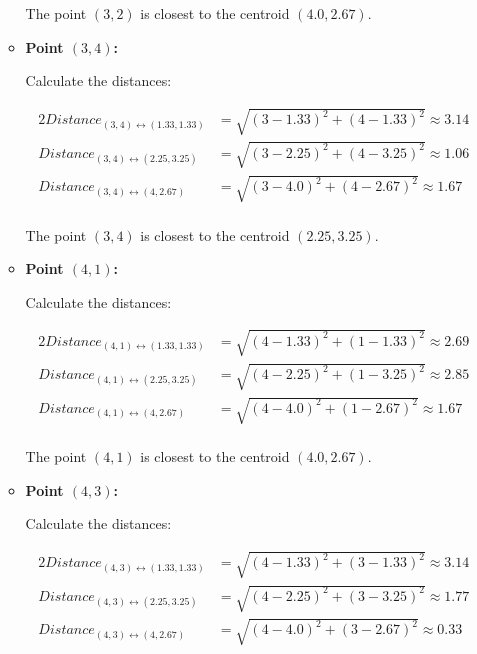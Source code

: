 \documentclass[
english,
smallborders
]{i6prcsht}
\begin{document}
\begin{solution}
\begin{enumerate}
\begin{itemize}
			            The point $(3,2)$ is closest to the centroid $(4.0,2.67)$.

			      \item \textbf{Point $(3,4)$:}

			            Calculate the distances:

			            \begin{alignat*}{2}
				            Distance_{(3,4)\leftrightarrow(1.33,1.33)} & = \sqrt{(3-1.33)^2+(4-1.33)^2} \approx 3.14 \\
				            Distance_{(3,4)\leftrightarrow(2.25,3.25)} & = \sqrt{(3-2.25)^2+(4-3.25)^2} \approx 1.06 \\
				            Distance_{(3,4)\leftrightarrow(4,2.67)}    & = \sqrt{(3-4.0)^2+(4-2.67)^2} \approx 1.67  \\
			            \end{alignat*}

			            The point $(3,4)$ is closest to the centroid $(2.25,3.25)$.

			      \item \textbf{Point $(4,1)$:}

			            Calculate the distances:

			            \begin{alignat*}{2}
				            Distance_{(4,1)\leftrightarrow(1.33,1.33)} & = \sqrt{(4-1.33)^2+(1-1.33)^2} \approx 2.69 \\
				            Distance_{(4,1)\leftrightarrow(2.25,3.25)} & = \sqrt{(4-2.25)^2+(1-3.25)^2} \approx 2.85 \\
				            Distance_{(4,1)\leftrightarrow(4,2.67)}    & = \sqrt{(4-4.0)^2+(1-2.67)^2} \approx 1.67  \\
			            \end{alignat*}

			            The point $(4,1)$ is closest to the centroid $(4.0,2.67)$.

			      \item \textbf{Point $(4,3)$:}

			            Calculate the distances:

			            \begin{alignat*}{2}
				            Distance_{(4,3)\leftrightarrow(1.33,1.33)} & = \sqrt{(4-1.33)^2+(3-1.33)^2} \approx 3.14 \\
				            Distance_{(4,3)\leftrightarrow(2.25,3.25)} & = \sqrt{(4-2.25)^2+(3-3.25)^2} \approx 1.77 \\
				            Distance_{(4,3)\leftrightarrow(4,2.67)}    & = \sqrt{(4-4.0)^2+(3-2.67)^2} \approx 0.33  \\
			            \end{alignat*}


\end{itemize}
\end{enumerate}
\end{solution}
\end{document}
